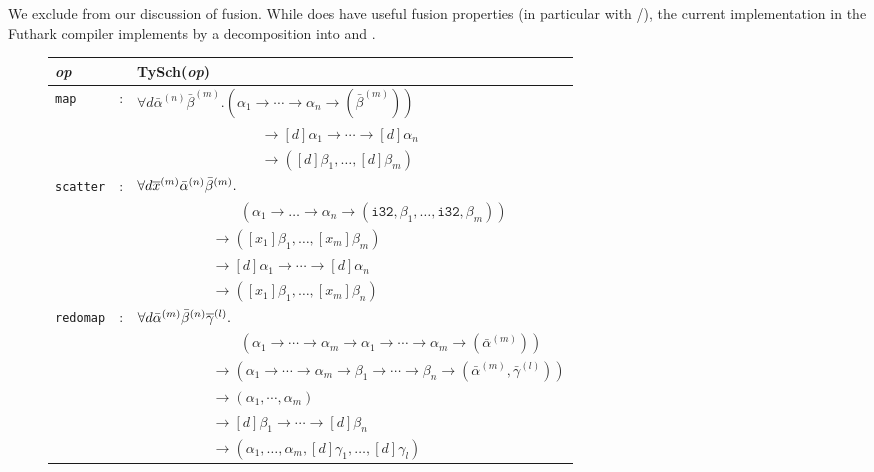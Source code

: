 We exclude  from our discussion of fusion.  While
 does have useful fusion properties (in particular with
/), the current implementation in the Futhark
compiler implements  by a decomposition into  and
.

\begin{figure}[hbt]
\begin{tabular}{lcl}
\emph{op} & & \textrm{TySch}(\emph{op}) \\ \hline
  {\lstinline!map!} & : & $\forall d \bar{\alpha}^{(n)}\bar{\beta}^{(m)}. (\alpha_1 \rightarrow \cdots \rightarrow \alpha_n \rightarrow (\bar{\beta}^{(m)}))$ \\
          & & ~~~~~~~~~~~~~~~~~ $\rightarrow [d]\alpha_1 \rightarrow \cdots \rightarrow [d]\alpha_n$ \\
          & & ~~~~~~~~~~~~~~~~~ $\rightarrow ([d]\beta_1,\ldots,[d]\beta_m)$ \\
  {\lstinline!scatter!} & : & $\forall d \overline{x}^{(m)} \bar{\alpha}^{(n)}\bar{\beta}^{(m)}.$\\
          & & ~~~~~~~~~~~~~~ $(\alpha_1 \rightarrow \ldots \rightarrow \alpha_n \rightarrow (\texttt{i32}, \beta_{1}, \ldots, \texttt{i32}, \beta_{m}))$\\
          & & ~~~~~~~~~~ $\rightarrow ([x_{1}]\beta_1, \ldots, [x_{m}]\beta_m)$\\
          & & ~~~~~~~~~~ $\rightarrow [d]\alpha_1 \rightarrow \cdots \rightarrow [d]\alpha_n$\\
          & & ~~~~~~~~~~ $\rightarrow ([x_{1}]\beta_1, \ldots, [x_{m}]\beta_n)$\\
  {\lstinline!redomap!} & : & $\forall d \bar{\alpha}^{(m)}\bar{\beta}^{(n)}\overline{\gamma}^{(l)}.$\\
          & & ~~~~~~~~~~~~~~ $(\alpha_1 \rightarrow \cdots \rightarrow \alpha_m \rightarrow \alpha_1 \rightarrow \cdots \rightarrow \alpha_m \rightarrow (\bar{\alpha}^{(m)}))$\\
          & & ~~~~~~~~~~ $\rightarrow (\alpha_1 \rightarrow \cdots \rightarrow \alpha_m \rightarrow \beta_1 \rightarrow \cdots \rightarrow \beta_n \rightarrow (\bar{\alpha}^{(m)}, \bar{\gamma}^{(l)}))$ \\
          & & ~~~~~~~~~~ $\rightarrow (\alpha_1, \cdots, \alpha_m)$\\
          & & ~~~~~~~~~~ $\rightarrow [d]\beta_1 \rightarrow \cdots \rightarrow [d]\beta_n$\\
          & & ~~~~~~~~~~ $\rightarrow (\alpha_1,\ldots,\alpha_m,[d]\gamma_{1},\ldots,[d]\gamma_{l})$ \\

\end{tabular}
\end{figure}

